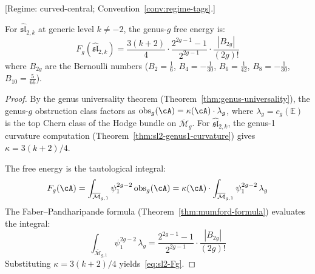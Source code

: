 \begin{theorem}\label{thm:sl2-all-genera}
\textup{[Regime: curved-central\textup{;}
Convention~\textup{\ref{conv:regime-tags}}.]}

For $\widehat{\mathfrak{sl}}_{2,k}$ at generic level $k \neq -2$, the genus-$g$ free energy is:
\begin{equation}\label{eq:sl2-Fg}
F_g(\widehat{\mathfrak{sl}}_{2,k}) = \frac{3(k+2)}{4} \cdot \frac{2^{2g-1}-1}{2^{2g-1}} \cdot \frac{|B_{2g}|}{(2g)!}
\end{equation}
where $B_{2g}$ are the Bernoulli numbers ($B_2 = \frac{1}{6}$, $B_4 = -\frac{1}{30}$, $B_6 = \frac{1}{42}$, $B_8 = -\frac{1}{30}$, $B_{10} = \frac{5}{66}$).
\end{theorem}

\begin{proof}
By the genus universality theorem (Theorem~\ref{thm:genus-universality}), the genus-$g$ obstruction class factors as $\mathrm{obs}_g(\cA) = \kappa(\cA) \cdot \lambda_g$, where $\lambda_g = c_g(\mathbb{E})$ is the top Chern class of the Hodge bundle on $\overline{\mathcal{M}}_g$.  For $\widehat{\mathfrak{sl}}_{2,k}$, the genus-1 curvature computation (Theorem~\ref{thm:sl2-genus1-curvature}) gives $\kappa = 3(k+2)/4$.

The free energy is the tautological integral:
\[
F_g(\cA) = \int_{\overline{\mathcal{M}}_{g,1}} \psi_1^{2g-2}\, \mathrm{obs}_g(\cA) = \kappa(\cA) \cdot \int_{\overline{\mathcal{M}}_{g,1}} \psi_1^{2g-2}\, \lambda_g
\]
The Faber--Pandharipande formula (Theorem~\ref{thm:mumford-formula}) evaluates the integral:
\[
\int_{\overline{\mathcal{M}}_{g,1}} \psi_1^{2g-2}\, \lambda_g = \frac{2^{2g-1}-1}{2^{2g-1}} \cdot \frac{|B_{2g}|}{(2g)!}
\]
Substituting $\kappa = 3(k+2)/4$ yields~\eqref{eq:sl2-Fg}.
\end{proof}

